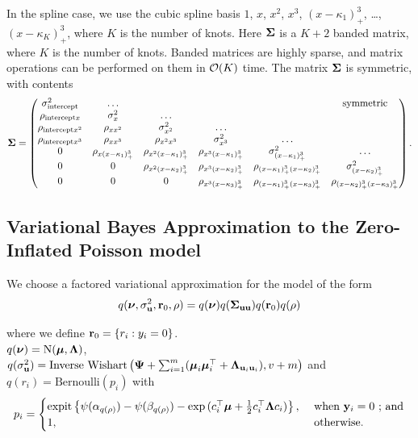 
In the spline case, we use the cubic spline basis $1$, $x$, $x^2$, $x^3$, $(x -
\kappa_1)^3_+$, \ldots, $(x - \kappa_K)^3_+$, where $K$ is the number of knots.
Here ${\boldsymbol \Sigma}$ is a $K + 2$ banded matrix, where $K$ is the number of knots.
Banded matrices are highly sparse, and matrix operations can be performed on
them in $\mathcal{O}(K)$ time. The matrix ${\boldsymbol \Sigma}$ is symmetric, with contents
\[
	{\boldsymbol \Sigma} =
	\begin{pmatrix}
		\sigma^2_{\text{intercept}} & \ldots                      &                             &                               &                                          & \text{symmetric}              \\
		\rho_{\text{intercept} x} & \sigma^2_x & \ldots\\
		\rho_{\text{intercept} x^2} & \rho_{x x^2} & \sigma^2_{x^2} & \ldots \\
		\rho_{\text{intercept} x^3} & \rho_{x x^3} & \rho_{x^2 x^3} & \sigma^2_{x^3} & \ldots \\
		0                           & \rho_{x (x - \kappa_1)^3_+} & \rho_{x^2 (x-\kappa_1)_+^3} & \rho_{x^3 (x - \kappa_1)_+^3} & \sigma^2_{(x - \kappa_1)_+^3}            & \ldots                        \\
		0                           & 0                           & \rho_{x^2 (x-\kappa_2)_+^3} & \rho_{x^3 (x-\kappa_2)_+^3}   & \rho_{(x-\kappa_1)_+^3 (x-\kappa_2)_+^3} & \sigma^2_{(x - \kappa_2)_+^3} \\
		0 & 0 & 0 & \rho_{x^3 (x - \kappa_3)_+^3} & \rho_{(x - \kappa_1)_+^3 (x - \kappa_3)_+^3} & \rho_{(x - \kappa_2)_+^3 (x - \kappa_3)_+^3}
	\end{pmatrix}.
\]

\subsection{Variational Bayes Approximation to the Zero-Inflated Poisson model}

We choose a factored variational approximation for the model of the form 
\[
	q({\boldsymbol \nu}, \sigma_{{\bf u}}^2,{\bf r}_0, \rho) = q({\boldsymbol \nu}) q({\boldsymbol \Sigma}_{{\bf u} {\bf u}}) q({\bf r}_0) q(\rho)
\]

\noindent 

where we define ${\bf r}_0 = \{ r_i : y_i = 0 \}$. \\
$q({\boldsymbol \nu}) = \text{N}({\boldsymbol \mu}, {\boldsymbol \Lambda})$, \\ $q(\sigma_{{\bf u}}^2) = \text{Inverse
Wishart}\left({\boldsymbol \Psi} + \sum_{i=1}^m ({\boldsymbol \mu}_i {\boldsymbol \mu}_i^\top + {\boldsymbol \Lambda}_{{\bf u}_i
{\bf u}_i}), v + m \right)$ \mbox{and } \\ $q(r_i) = \text{Bernoulli}{(p_i)}$ with
$$p_i = 
\begin{cases}
\text{expit}\left\{ \psi{(\alpha_{q(\rho)})} - \psi{(\beta_{q(\rho)})} - \exp{(c_i^\top{\boldsymbol\mu}+ \frac{1}{2} c_i^\top {\boldsymbol\Lambda}c_i)} \right\},& \text{ when } {\bf y}_i = 0\text{ ; and}\\
1,& \text{ otherwise.}
\end{cases}$$

